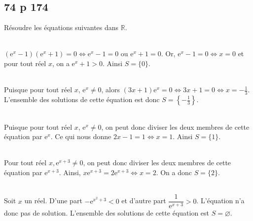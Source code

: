 \documentclass[12pt,a4paper]{book}
\begin{document}
\subsection*{74 p 174}
Résoudre les équations suivantes dans $\mathbb{R}$.

\begin{enumMet}
    \item {}\\
    $\left(\mathrm{e}^{x}-1\right)\left(\mathrm{e}^{x}+1\right)=0 \Leftrightarrow \mathrm{e}^{x}-1=0$ ou $\mathrm{e}^{x}+1=0$. Or, $\mathrm{e}^{x}-1=0 \Leftrightarrow x=0$ et pour tout réel $x$, on a $\mathrm{e}^{x}+1>0$. Ainsi $S=\{0\}$.
    \item {}\\
    Puisque pour tout réel $x$, $\mathrm{e}^{x} \neq 0$, alors $(3 x+1) \mathrm{e}^{x}=0 \Leftrightarrow 3 x+1=0 \Leftrightarrow x=-\frac{1}{3}$. L'ensemble des solutions de cette équation est donc $S=\left\{-\frac{1}{3}\right\}$.
    \item {}\\
    Puisque pour tout réel $x$, $\mathrm{e}^{x} \neq 0$, on peut donc diviser les deux membres de cette équation par $\mathrm{e}^{x}$. Ce qui nous donne $2 x-1=1 \Leftrightarrow x=1$. Ainsi $S=\{1\}$.
    \item {}\\
    Pour tout réel $x, \mathrm{e}^{x+3} \neq 0$, on peut donc diviser les deux membres de cette équation par $\mathrm{e}^{x+3}$. Ainsi, $x \mathrm{e}^{x+3}=2 \mathrm{e}^{x+3} \Leftrightarrow x=2$. On a donc $S=\{2\}$.
    \item {}\\
    Soit $x$ un réel. D'une part $-\mathrm{e}^{x^{2}+3}<0$ et d'autre part $\dfrac{1}{\mathrm{e}^{x+3}}>0$. L'équation n'a donc pas de solution. L'ensemble des solutions de cette équation est $S=\varnothing$.
\end{enumMet}
\end{document}
